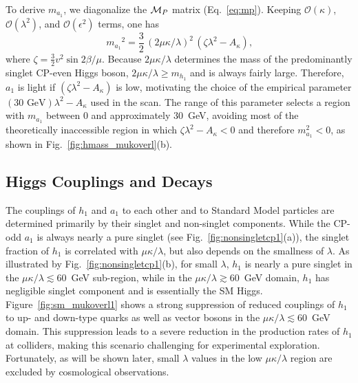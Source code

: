 \documentclass[aps,prl,twocolumn,nofootinbib,superscriptaddress]{revtex4}
\def\CM{{\cal M}}
\begin{document}
To derive $m_{a_1}$, we diagonalize the $\CM_{P}$ matrix
(Eq.~\ref{eq:mp}).  Keeping $\mathcal{O}(\kappa)$,
$\mathcal{O}(\lambda^2)$, and $\mathcal{O}(\epsilon^2)$ terms, one has
\begin{equation}
{m_{a_1}}^2 = \frac{3}{2} \, (2 \mu \kappa/\lambda)^2 \, (\zeta \lambda^2 -A_\kappa)\mbox{,}
\end{equation}
where $\zeta = \frac{3}{2} v^2\sin 2\beta/\mu$.  Because
$2\mu\kappa/\lambda$ determines the mass of the predominantly singlet
CP-even Higgs boson, $2\mu\kappa/\lambda \geq m_{h_1}$ and is always
fairly large.  Therefore, $a_1$ is light if $(\zeta \lambda^2 -
A_\kappa)$ is low, motivating the choice of the empirical parameter
$(\mbox{30~GeV}) \lambda^2 - A_\kappa$ used in the scan.  The range of
this parameter selects a region with $m_{a_1}$ between 0 and
approximately 30~GeV, avoiding most of the theoretically inaccessible
region in which $\zeta\lambda^2-A_\kappa < 0$ and therefore $m_{a_1}^2 <
0$, as shown in Fig.~\ref{fig:hmass_mukoverl}(b).

\subsection{Higgs Couplings and Decays}

The couplings of $h_1$ and $a_1$ to each other and to Standard Model
particles are determined primarily by their singlet and non-singlet
components.  While the CP-odd $a_1$ is always nearly a pure singlet
(see Fig.~\ref{fig:nonsingletcp1}(a)), the singlet fraction of $h_1$
is correlated with $\mu\kappa/\lambda$, but also depends on the
smallness of $\lambda$.  As illustrated by
Fig.~\ref{fig:nonsingletcp1}(b), for small $\lambda$, $h_1$ is nearly
a pure singlet in the $\mu\kappa/\lambda \lesssim 60$~GeV sub-region,
while in the $\mu\kappa/\lambda \gtrsim 60$~GeV domain, $h_1$ has
negligible singlet component and is essentially the SM Higgs.
Figure~\ref{fig:sm_mukoverl1} shows a strong suppression of reduced
couplings of $h_1$ to up- and down-type quarks as well as vector
bosons in the $\mu\kappa/\lambda \lesssim 60$~GeV domain.  This
suppression leads to a severe reduction in the production rates of
$h_1$ at colliders, making this scenario challenging for experimental
exploration.  Fortunately, as will be shown later, small $\lambda$
values in the low $\mu\kappa/\lambda$ region are excluded by
cosmological observations.
\end{document}

